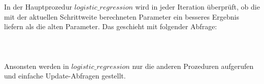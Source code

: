 In der Hauptprozedur $logistic\_regression$ wird in jeder Iteration überprüft, ob die mit der aktuellen Schrittweite berechneten Parameter ein besseres Ergebnis liefern als die alten Parameter. Das geschieht mit folgender Abfrage:
\\\\
\noindent{}
\\\\
Ansonsten werden in $logistic\_regression$ nur die anderen Prozeduren aufgerufen und einfache Update-Abfragen gestellt.
